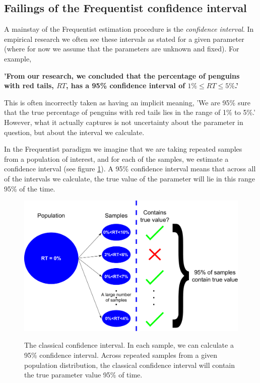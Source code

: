 \documentclass[11pt,fullpage]{book}
\begin{document}
\subsection{Failings of the Frequentist confidence interval}\label{sec:Posterior_classicalConfidenceInterval}
A mainstay of the Frequentist estimation procedure is the \textit{confidence interval}. In empirical research we often see these intervals as stated for a given parameter (where for now we assume that the parameters are unknown and fixed). For example,

\textbf{'From our research, we concluded that the percentage of penguins with red tails, $RT$, has a 95\% confidence interval of $1\%\leq RT \leq 5\%$.'}

This is often incorrectly taken as having an implicit meaning, 'We are 95\% sure that the true percentage of penguins with red tails lies in the range of 1\% to 5\%.' However, what it actually captures is not uncertainty about the parameter in question, but about the interval we calculate. 

In the Frequentist paradigm we imagine that we are taking repeated samples from a population of interest, and for each of the samples, we estimate a confidence interval (see figure \ref{fig:Posterior_classicalConfidenceInterval}). A 95\% confidence interval means that across all of the intervals we calculate, the true value of the parameter will lie in this range 95\% of the time. 

\begin{figure}
\centering
\scalebox{0.4} 
{\includegraphics{Posterior_classicalConfidenceInterval.pdf}}
\caption{The classical confidence interval. In each sample, we can calculate a 95\% confidence interval. Across repeated samples from a given population distribution, the classical confidence interval will contain the true parameter value 95\% of time.}\label{fig:Posterior_classicalConfidenceInterval}
\end{figure}
\end{document}
